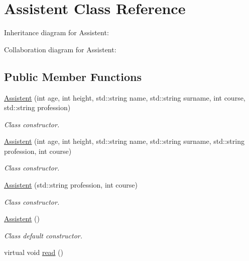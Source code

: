 \hypertarget{classAssistent}{}\section{Assistent Class Reference}
\label{classAssistent}


Inheritance diagram for Assistent\+:


Collaboration diagram for Assistent\+:
\subsection*{Public Member Functions}
\begin{DoxyCompactItemize}
\item 
\hyperlink{classAssistent_a08a75cce0e15aea59b13177d1384dd3e}{Assistent} (int age, int height, std\+::string name, std\+::string surname, int course, std\+::string profession)
\begin{DoxyCompactList}\small\item\em Class constructor. \end{DoxyCompactList}\item 
\hyperlink{classAssistent_a7fce47ab2254dc05b40390a54549ff08}{Assistent} (int age, int height, std\+::string name, std\+::string surname, std\+::string profession, int course)
\begin{DoxyCompactList}\small\item\em Class constructor. \end{DoxyCompactList}\item 
\hyperlink{classAssistent_a99699126196ef2f396daef5699beb0d9}{Assistent} (std\+::string profession, int course)
\begin{DoxyCompactList}\small\item\em Class constructor. \end{DoxyCompactList}\item 
\mbox{\label{classAssistent_ac196ff7c71a1efecdc8f2678246f5b91}} 
\hyperlink{classAssistent_ac196ff7c71a1efecdc8f2678246f5b91}{Assistent} ()
\begin{DoxyCompactList}\small\item\em Class default constructor. \end{DoxyCompactList}\item 
\mbox{\label{classAssistent_ae8c0b90b0eb31e413f975cc428d55fac}} 
virtual void \hyperlink{classAssistent_ae8c0b90b0eb31e413f975cc428d55fac}{read} ()

\end{DoxyCompactItemize}
